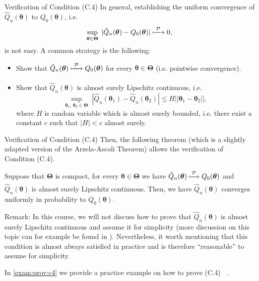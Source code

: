 \documentclass[envcountsect,usenames,dvipsnames]{beamer}
\def\btheta{\bm \theta}
\def\bTheta{\bm \Theta}
\theoremstyle{mystyle}
\begin{document}
\begin{frame}{Verification of Condition {\color{beamer@UIUCblue}(C.4)}}
\small
In general, establishing the uniform convergence of 
$\hat{Q}_n (\btheta)$ to $Q_0 (\btheta)$, i.e.
%
\begin{equation}
    \sup_{\btheta \in \bTheta} \; |\hat{Q}_n (\btheta) - {Q}_0 (\btheta)| \xmapsto[\;\;\;\;\; ]{\mathcal{P}} 0,
    \label{eq:conv:unif}
\end{equation}
%
is not easy. A common strategy is the following:
%
\begin{itemize}
    \item Show that $\hat{Q}_n (\btheta) \xmapsto[\;\;\;\;\; ]{\mathcal{P}} Q_0 (\btheta)$ for every $\btheta \in \bTheta$ (i.e. pointwise convergence).
    \item Show that $\hat{Q}_n (\btheta)$ is almost surely Lipschitz continuous, i.e.
    \begin{equation*}
        \sup_{\btheta_1, \, \btheta_2 \in \bTheta} \;  | \hat{Q}_n (\btheta_1) - \hat{Q}_n (\btheta_2) | \leq H ||\btheta_1 - \btheta_2 ||,
    \end{equation*}
    where $H$ is random variable which is almost surely bounded, i.e. there exist a constant $c$ such that $|H| < c$ almost surely.
\end{itemize}
\end{frame}

\begin{frame}[label = {discC4}]{Verification of Condition {\color{beamer@UIUCblue}(C.4)}}
\footnotesize
Then, the following theorem (which is a slightly adapted version of the Arzela-Ascoli Theorem) allows the verification of Condition {\color{beamer@UIUCblue}(C.4)}.

\begin{Theorem}
Suppose that $\bTheta$ is compact, for every $\btheta \in \bTheta$ we have $\hat{Q}_n (\btheta) \xmapsto[\;\;\;\; ]{\mathcal{P}} Q_0 (\btheta)$ and $\hat{Q}_n (\btheta)$ is almost surely Lipschitz continuous. Then, we have $\hat{Q}_n (\btheta)$ converges uniformly in probability to $Q_0 (\btheta)$.
\end{Theorem}

\begin{exampleblock}{Remark:}
In this course, we will not discuss how to prove that $\hat{Q}_n (\btheta)$ is almost surely Lipschitz continuous and assume it for simplicity (more discussion on this topic can for example be found in \cite{newey1994vlarge}). Nevertheless, it worth mentioning that this condition is almost always satisfied in practice and is therefore ``reasonable'' to assume for simplicity. 
\end{exampleblock}

\vspace{0.25cm}

In \ref{exam:prov:c4} we provide a practice example on how to prove {\color{beamer@UIUCblue}(C.4)} $\;$ \hyperlink{exam:prov:c4}{}.

\end{frame}
\end{document}
